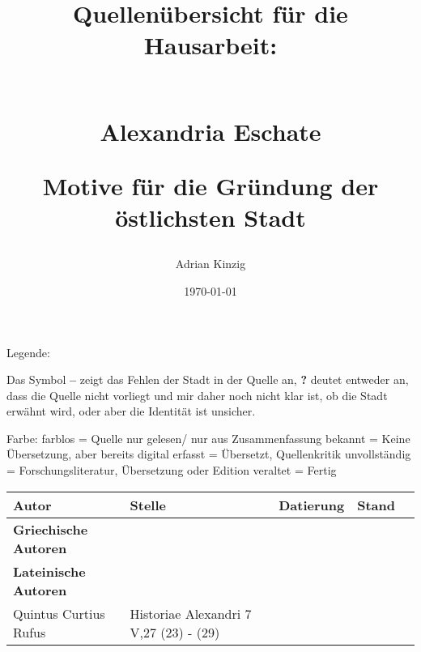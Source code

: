 \documentclass[a4paper, 12pt]{scrarticle}
\author{Adrian Kinzig}
\date{\today}
\title{
        \begin{normalsize}
Quellenübersicht für die Hausarbeit:
        \end{normalsize} \\
Alexandria Eschate\\
        \begin{normalsize}
Motive für die Gründung der östlichsten Stadt
        \end{normalsize}}
\begin{document}
\maketitle

	\noindent
	Legende:\vfill

	Das Symbol \textbf{--} zeigt das Fehlen der Stadt in der Quelle an,
	\textbf{?} deutet entweder an,
	dass die Quelle nicht vorliegt und mir daher noch nicht klar ist,
	ob die Stadt erwähnt wird,
	oder aber die Identität ist unsicher.

	Farbe:\vfill
	farblos                = Quelle nur gelesen/ nur aus Zusammenfassung bekannt\vfill
	\colorbox{red}{ }      = Keine Übersetzung, aber bereits digital erfasst\vfill
	\colorbox{orange}{ }   = Übersetzt, Quellenkritik unvollständig\vfill
	\colorbox{yellow}{ }   = Forschungsliteratur, Übersetzung oder Edition veraltet\vfill
	\colorbox{green}{ }    = Fertig\vfill


\begin{longtable}{lllll}
	Autor & Stelle & Datierung & Stand \\
        \hline
\endhead

        \textbf{Griechische Autoren}&
        &
        &
        &
        \cellcolor{white}\\


        \textbf{Lateinische Autoren}&
        &
        &
        &
        \cellcolor{white}\\

        Quintus Curtius Rufus&
	Historiae Alexandri 7 V,27 (23) - (29) &
        &
        \cellcolor{white}\\
  
\end{longtable}
\end{document}
